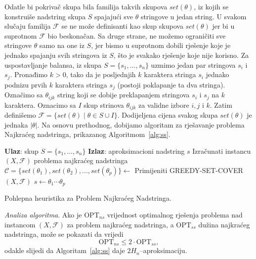 \documentclass[a4paper, utf8, 11pt, colorlinks]{book}
\theoremstyle{definition}
\begin{document}
 Odatle bi pokrivač skupa bila familija takvih skupova $set(\theta)$, iz kojih se konstruiše nadstring skupa $S$ spajajući sve $\theta$ stringove u jedan string. U svakom slučaju familija  $\mathcal{F}$ se ne može definisanti kao skup skupova $set(\theta)$ jer bi u suprotnom $\mathcal{F}$ bio beskonačan. Sa druge strane, ne možemo ograničiti sve stringove $\theta$ samo na one iz $S$, jer bismo u suprotnom dobili rješenje koje je jednako spajanju svih stringova iz $S$, što je svakako  rješenje koje nije korisno. Za uspostavljanje balansa,  iz skupa $S=\{s_1,...,s_n\}$ uzmimo jedan par stringova $s_i$ i $s_j$. Pronađimo $k>0$,  tako da je posljednjih $k$ karaktera stringa $s_i$ jednako podnizu   prvih $k$ karaktera stringa $s_j$ (postoji poklapanje ta dva stringa). Označimo sa $\theta_{ijk}$ string koji se 
dobije preklapanjem stringova $s_i$ i $s_j$ na $k$ karaktera. Oznacimo sa $I$ skup strinova $\theta_{ijk}$  za validne izbore $i,j$ i $k$. Zatim definišemo $\mathcal{F}=\{set(\theta) \mid  \theta \in S \cup I\}$. Dodijeljena cijena svakog skupa $set(\theta)$ je jednaka $|\theta|$. Na osnovu prethodnog, dobijamo algoritam za rješavanje problema Najkraćeg nadstringa, prikazanog Algoritmom~\ref{alg:ss}. 

  \begin{algorithm}[!t] 
	\begin{algorithmic}[1]
		\STATE \textbf{Ulaz}: skup $S=\{s_1,...,s_n\}$
		\STATE \textbf{Izlaz}: aproksimacioni nadstring $s$
		\STATE Izračunati instancu $(X,\mathcal{F})$ problema najkraćeg nadstringa
		\STATE  $\mathcal{C}=\{set(\theta_1), set(\theta_2),...,set(\theta_p)\}\gets$ Primijeniti GREEDY-SET-COVER$(X,\mathcal{F})$
		\STATE  $s \gets \theta_1 \cdots \theta_p$
	\end{algorithmic}
	\caption{Pohlepna heuristika za Problem Najkraćeg Nadstringa.}
	\label{alg:ss}
\end{algorithm}

\emph{Analiza algoritma}. 
Ako je $\mathrm{OPT}_{ns}$ vrijednost optimalnog rješenja problema  nad instancom $(X,\mathcal{F})$ za problem  najkraćeg nadstringa, a $\mathrm{OPT}_{ss}$ dužina najkraćeg nadstringa, može se pokazati da vrijedi 
$$\mathrm{OPT}_{ns} \leq 2 \cdot \mathrm{OPT}_{ss},$$
odakle slijedi da Algoritam~\ref{alg:ss} daje $2H_n$--aproksimaciju. 
\end{document}

